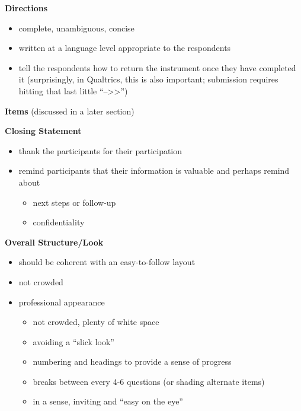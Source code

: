 \documentclass[
  english,
]{book}
\providecommand{\tightlist}{%
  \setlength{\itemsep}{0pt}\setlength{\parskip}{0pt}}
\begin{document}
\textbf{Directions}

\begin{itemize}
\tightlist
\item
  complete, unambiguous, concise
\item
  written at a language level appropriate to the respondents
\item
  tell the respondents how to return the instrument once they have completed it (surprisingly, in Qualtrics, this is also important; submission requires hitting that last little ``--\textgreater\textgreater{}'')
\end{itemize}

\textbf{Items} (discussed in a later section)

\textbf{Closing Statement}

\begin{itemize}
\tightlist
\item
  thank the participants for their participation
\item
  remind participants that their information is valuable and perhaps remind about

  \begin{itemize}
  \tightlist
  \item
    next steps or follow-up
  \item
    confidentiality
  \end{itemize}
\end{itemize}

\textbf{Overall Structure/Look}

\begin{itemize}
\tightlist
\item
  should be coherent with an easy-to-follow layout
\item
  not crowded
\item
  professional appearance

  \begin{itemize}
  \tightlist
  \item
    not crowded, plenty of white space
  \item
    avoiding a ``slick look''
  \item
    numbering and headings to provide a sense of progress
  \item
    breaks between every 4-6 questions (or shading alternate items)
  \item
    in a sense, inviting and ``easy on the eye''
  \end{itemize}
\end{itemize}
\end{document}
